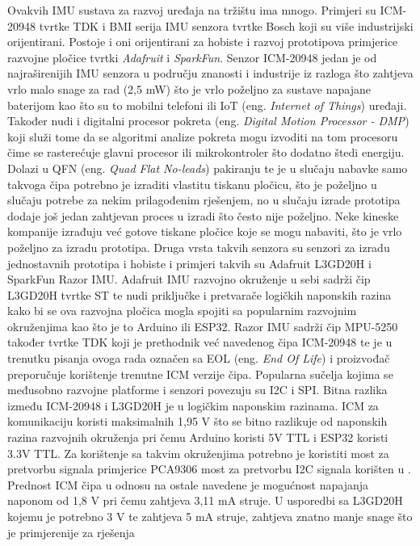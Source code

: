 \documentclass[times, utf8, diplomski]{fer}
\begin{document}
Ovakvih IMU sustava za razvoj uređaja na tržištu ima mnogo. Primjeri su ICM-20948 tvrtke TDK i BMI serija IMU senzora tvrtke
Bosch koji su više industrijski orijentirani. Postoje i oni orijentirani za hobiste i razvoj prototipova primjerice razvojne pločice
tvrtki \textit{Adafruit} i \textit{SparkFun}. Senzor ICM-20948 jedan je od najraširenijih IMU senzora u području znanosti i
industrije iz razloga što zahtjeva vrlo malo snage za rad (2,5 mW) \citep{ICM} što je vrlo poželjno 
za sustave napajane baterijom kao što su to mobilni telefoni ili IoT (eng. \textit{Internet of Things}) uređaji.
Također nudi i digitalni procesor pokreta (eng. \textit{Digital Motion Processor - DMP}) koji služi tome da se algoritmi analize
pokreta mogu izvoditi na tom procesoru čime se rasterećuje glavni procesor ili mikrokontroler što dodatno štedi energiju. Dolazi u
QFN (eng. \textit{Quad Flat No-leads}) pakiranju te je u slučaju nabavke samo takvoga čipa potrebno je izraditi vlastitu tiskanu
pločicu, što je poželjno u slučaju potrebe za nekim prilagođenim rješenjem, no u slučaju izrade prototipa dodaje još jedan zahtjevan
proces u izradi što često nije poželjno. Neke kineske kompanije izrađuju već gotove tiskane pločice koje se mogu nabaviti, što je vrlo
poželjno za izradu prototipa. Druga vrsta takvih senzora su senzori za izradu jednostavnih prototipa i hobiste i primjeri takvih su
Adafruit L3GD20H i SparkFun Razor IMU. Adafruit IMU razvojno okruženje u sebi sadrži čip L3GD20H tvrtke ST te nudi priključke i
pretvarače logičkih naponskih razina kako bi se ova razvojna pločica mogla spojiti sa popularnim razvojnim okruženjima kao što je to Arduino ili
ESP32. Razor IMU sadrži čip MPU-5250 također tvrtke TDK koji je prethodnik već navedenog čipa ICM-20948 te je u trenutku pisanja
ovoga rada označen sa EOL (eng. \textit{End Of Life}) i proizvođač preporučuje korištenje trenutne ICM verzije čipa.
Popularna sučelja kojima se međusobno razvojne platforme i senzori povezuju su I2C i SPI. Bitna razlika između ICM-20948 i L3GD20H
je u logičkim naponskim razinama. ICM za komunikaciju koristi maksimalnih 1,95 V što se bitno razlikuje od naponskih
razina razvojnih okruženja pri čemu Arduino koristi 5V TTL i ESP32 koristi 3.3V TTL. Za korištenje sa takvim okruženjima potrebno je
koristiti most za pretvorbu signala primjerice PCA9306 most za pretvorbu I2C signala korišten u \cite{mini_data_capture}.
Prednost ICM čipa u odnosu na ostale navedene je mogućnost napajanja naponom od 1,8 V pri čemu zahtjeva 3,11 mA struje.
U usporedbi sa L3GD20H kojemu je potrebno 3 V te zahtjeva 5 mA struje, zahtjeva znatno manje snage što je primjerenije za rješenja
\end{document}
